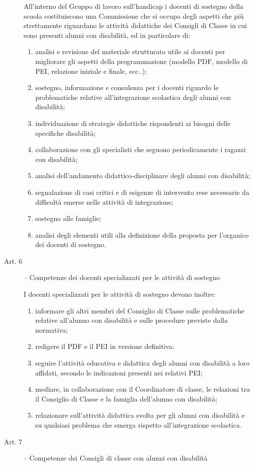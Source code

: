 \begin{description}
	All'interno del Gruppo di lavoro sull'handicap i docenti di sostegno della scuola costituiscono una
	Commissione che si occupa degli aspetti che più strettamente riguardano le attività didattiche dei
	Consigli di Classe in cui sono presenti alunni con disabilità, ed in particolare di:
	\begin{enumerate}
		\item  analisi e revisione del materiale strutturato utile ai docenti per migliorare gli aspetti della
		programmazione (modello PDF, modello di PEI, relazione iniziale e finale, ecc..);
		\item sostegno, informazione e consulenza per i docenti riguardo le problematiche relative
		all'integrazione scolastica degli alunni con disabilità;
		\item individuazione di strategie didattiche rispondenti ai bisogni delle specifiche disabilità;
		\item collaborazione con gli specialisti che seguono periodicamente i ragazzi con disabilità;
		\item analisi dell'andamento didattico-disciplinare degli alunni con disabilità;
		\item segnalazione di casi critici e di esigenze di intervento rese necessarie da difficoltà emerse nelle
		attività di integrazione;
		\item sostegno alle famiglie;
		\item analisi degli elementi utili alla definizione della proposta per l’organico dei docenti di sostegno.
	\end{enumerate}
	\item [Art. 6] --  Competenze dei docenti specializzati per le attività di sostegno
	
	I docenti specializzati per le attività di sostegno devono inoltre:
	\begin{enumerate}
		\item informare gli altri membri del Consiglio di Classe sulle problematiche relative all'alunno
		con disabilità e sulle procedure previste dalla normativa;
		\item redigere il PDF e il PEI in versione definitiva;
		\item seguire l'attività educativa e didattica degli alunni con disabilità a loro affidati, secondo le
		indicazioni presenti nei relativi PEI;
		\item mediare, in collaborazione con il Coordinatore di classe, le relazioni tra il Consiglio di
		Classe e la famiglia dell'alunno con disabilità;
		\item relazionare sull'attività didattica svolta per gli alunni con disabilità e su qualsiasi problema
		che emerga rispetto all'integrazione scolastica.
	\end{enumerate}
	\item [Art. 7] -- Competenze dei Consigli di classe con alunni con disabilità
	

\end{description}
